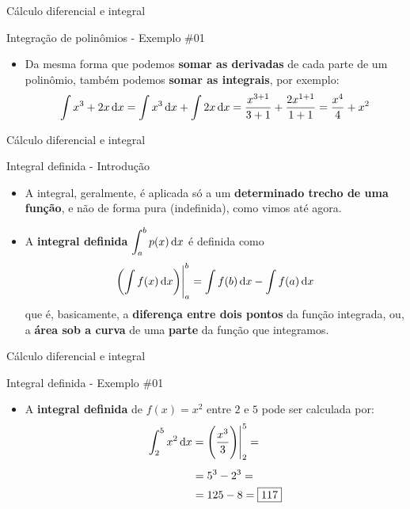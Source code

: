 \begin{frame}{Cálculo diferencial e integral}
	\begin{block}{Integração de polinômios - Exemplo \#01}
		\begin{itemize}
			\item Da mesma forma que podemos \textbf{somar as derivadas} de cada parte de um polinômio, também podemos \textbf{somar as integrais}, por exemplo:
			\[ \int x^{3}+2x \dif x=\int x^{3} \dif x + \int 2x \dif x= \dfrac{x^{3+1}}{3+1}+\dfrac{2x^{1+1}}{1+1}=\dfrac{x^{4}}{4}+x^{2} \]
		\end{itemize}
	\end{block}
\end{frame}


\begin{frame}{Cálculo diferencial e integral}
	\begin{block}{Integral definida - Introdução}
		\begin{itemize}
			\item A integral, geralmente, é aplicada só a um \textbf{determinado trecho de uma função}, e não de forma pura (indefinida), como vimos até agora.
			\item A \textbf{integral definida} $ \displaystyle\int_{a}^{b}p(x) \dif x $ é definida como \[ \eval{\left( \int f(x) \dif x\right) }_{a}^{b}=\int f(b) \dif x-\int f(a) \dif x \]
			que é, basicamente, a \textbf{diferença entre dois pontos} da função integrada, ou, a \textbf{área sob a curva} de uma \textbf{parte} da função que integramos.
		\end{itemize}
	\end{block}
\end{frame}


\begin{frame}{Cálculo diferencial e integral}
	\begin{block}{Integral definida - Exemplo \#01}
		\begin{itemize}
			\item A \textbf{integral definida} de $ f(x)=x^{2} $ entre $ 2 $ e $ 5 $ pode ser calculada por:
			\begin{align*}
			\int_{2}^{5}x^{2}\dif x&=\eval{\left( \dfrac{x^{3}}{3}\right) }_{2}^{5}=\\[0.5em]
			&=5^{3}-2^{3}=\\
			&=125-8=\boxed{117}
			\end{align*}
		\end{itemize}
	\end{block}
\end{frame}


